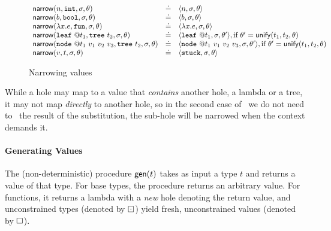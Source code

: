 \begin{figure*}[ht]
$$\begin{array}{lcl}
\mathsf{narrow}(n, \mathtt{int}, \sigma, \theta)     & \doteq & \langle n, \sigma, \theta \rangle \\
\mathsf{narrow}(b, \mathtt{bool}, \sigma, \theta)    & \doteq & \langle b, \sigma, \theta \rangle \\
\mathsf{narrow}(\lambda x. e, \mathtt{fun}, \sigma, \theta) & \doteq & \langle \lambda x. e, \sigma, \theta \rangle \\
\mathsf{narrow}(\mathtt{leaf}\ @t_1, \mathtt{tree}\ t_2, \sigma, \theta) & \doteq & \langle \mathtt{leaf}\ @t_1, \sigma, \theta' \rangle, \mbox{if}\ \theta' = \mathsf{unify}(t_1,t_2,\theta) \\
\mathsf{narrow}(\mathtt{node}\ @t_1\ v_1\ v_2\ v_3, \mathtt{tree}\ t_2, \sigma, \theta) & \doteq & \langle \mathtt{node}\ @t_1\ v_1\ v_2\ v_3, \sigma, \theta' \rangle, \mbox{if}\ \theta' = \mathsf{unify}(t_1,t_2,\theta) \\
\mathsf{narrow}(v, t, \sigma, \theta) & \doteq & \langle \mathtt{stuck}, \sigma, \theta \rangle
\end{array}
$$
\caption{Narrowing values}
\label{fig:narrow}
\end{figure*}
%
While a hole may map to a value that \emph{contains} another hole, \eg a
lambda or a tree, it may not map \emph{directly} to another hole, so in
the second case of \forcesym\ we do not need to \forcesym\ the result of the
substitution, the sub-hole will be narrowed when the context demands it.

\paragraph{Generating Values} The (non-deterministic) procedure $\mathsf{gen}(t)$
takes as input a type $t$ and returns a value of that type. For base
types, the procedure returns an arbitrary value. For functions, it returns
a lambda with a \emph{new} hole denoting the return value, and unconstrained
types (denoted by $\boxdot$) yield fresh, unconstrained values
(denoted by $\square$).

